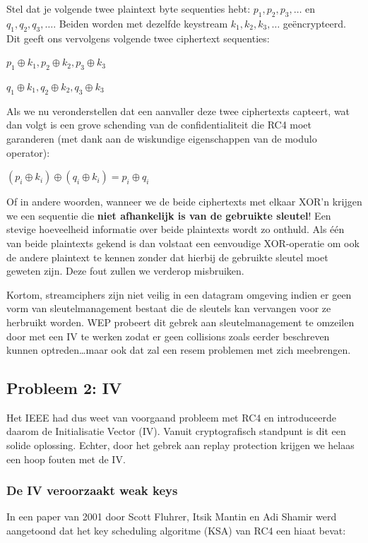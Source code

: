 \documentclass[
  10pt,
  dutch,
  paper=a4,
  ,captions=tableheading
]{scrbook}
\begin{document}
Stel dat je volgende twee plaintext byte sequenties hebt:
\(p_1,p_2,p_3,…\) en \(q_1,q_2,q_3,…\). Beiden worden met dezelfde
keystream \(k_1,k_2,k_3,…\) geëncrypteerd. Dit geeft ons vervolgens
volgende twee ciphertext sequenties:

\(p_1 \oplus k_1, p_2 \oplus k_2, p_3 \oplus k_3\)

\(q_1 \oplus k_1, q_2 \oplus k_2, q_3 \oplus k_3\)

Als we nu veronderstellen dat een aanvaller deze twee ciphertexts
capteert, wat dan volgt is een grove schending van de confidentialiteit
die RC4 moet garanderen (met dank aan de wiskundige eigenschappen van de
modulo operator):

\((p_i \oplus k_i) \oplus (q_i \oplus k_i) = p_i \oplus q_i\)

Of in andere woorden, wanneer we de beide ciphertexts met elkaar XOR'n
krijgen we een sequentie die \textbf{niet afhankelijk is van de
gebruikte sleutel}! Een stevige hoeveelheid informatie over beide
plaintexts wordt zo onthuld. Als één van beide plaintexts gekend is dan
volstaat een eenvoudige XOR-operatie om ook de andere plaintext te
kennen zonder dat hierbij de gebruikte sleutel moet geweten zijn. Deze
fout zullen we verderop misbruiken.

Kortom, streamciphers zijn niet veilig in een datagram omgeving indien
er geen vorm van sleutelmanagement bestaat die de sleutels kan vervangen
voor ze herbruikt worden. WEP probeert dit gebrek aan sleutelmanagement
te omzeilen door met een IV te werken zodat er geen collisions zoals
eerder beschreven kunnen optreden\ldots maar ook dat zal een resem
problemen met zich meebrengen.

\subsection{Probleem 2: IV}\label{probleem-2-iv}

Het IEEE had dus weet van voorgaand probleem met RC4 en introduceerde
daarom de Initialisatie Vector (IV). Vanuit cryptografisch standpunt is
dit een solide oplossing. Echter, door het gebrek aan replay protection
krijgen we helaas een hoop fouten met de IV.

\subsubsection{De IV veroorzaakt weak
keys}\label{de-iv-veroorzaakt-weak-keys}

In een paper van 2001 door Scott Fluhrer, Itsik Mantin en Adi Shamir
werd aangetoond dat het key scheduling algoritme (KSA) van RC4 een hiaat
bevat:
\end{document}
